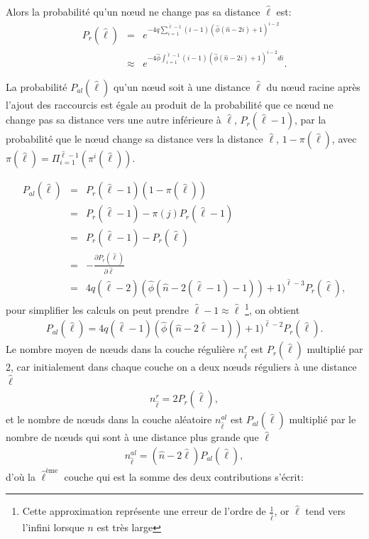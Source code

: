 Alors la probabilité qu'un nœud ne change pas sa distance $\hat{\ell}$ est: 
\begin{eqnarray}
\label{pr}
P_r(\hat{\ell})&=& e^{-4q\sum_{i=1}^{\hat{\ell}-1}(i-1)(\hat{\phi}(\hat{n}-2i)+1)^{i-2}}\\\nonumber
&\approx&e^{-4\hat{\phi}\int_{i=1}^{\hat{\ell}-1}(i-1)(\hat{\phi}(\hat{n}-2i)+1)^{i-2}di}.
\end{eqnarray}

La probabilité $P_{al}(\hat{\ell})$ qu'un nœud soit à une  distance $\hat{\ell}$ du nœud racine après l'ajout des raccourcis est égale au produit de la probabilité que ce nœud ne change pas sa distance vers une autre inférieure à  $\hat{\ell}$, $P_r(\hat{\ell}-1)$, par la probabilité que le nœud change sa distance vers la  distance $\hat{\ell}$, $1-\pi(\hat{\ell})$, avec $\pi(\hat{\ell})=\Pi^{\hat{\ell}-1}_{i=1}(\pi^i(\hat{\ell}))$.

\begin{eqnarray}\nonumber
P_{al}(\hat{\ell})&=&P_r(\hat{\ell}-1)(1-\pi(\hat{\ell}))\\\nonumber
&=&P_r(\hat{\ell}-1)-\pi(j)P_r(\hat{\ell}-1)\\\nonumber
&=&P_r(\hat{\ell}-1)-P_r(\hat{\ell})\\\nonumber
&=&-\frac{\partial P_r(\hat{\ell})}{\partial \hat{\ell}}\\
&=&4q(\hat{\ell}-2)(\hat{\phi}(\hat{n}-2(\hat{\ell}-1)-1))+1)^{\hat{\ell}-3}P_r(\hat{\ell}),
\end{eqnarray}
pour simplifier les calculs on peut prendre $\hat{\ell}-1\approx \hat{\ell}$ \footnote{Cette approximation représente une erreur de l'ordre de $\frac{1}{\hat{\ell}}$, or $\hat{\ell}$ tend vers l'infini lorsque $n$ est très large}, on obtient
\begin{eqnarray}
P_{al}(\hat{\ell})=4q(\hat{\ell}-1)(\hat{\phi}(\hat{n}-2\hat{\ell}-1))+1)^{\hat{\ell}-2}P_r(\hat{\ell}).
\label{pal}
\end{eqnarray}
Le nombre  moyen de nœuds dans la couche régulière $n_{\hat{\ell}}^r$ est $P_r(\hat{\ell})$ multiplié par $2$, car initialement dans chaque couche on a  deux nœuds réguliers à une distance $\hat{\ell}$
\begin{eqnarray}
n_{\hat{\ell}}^r=2P_r(\hat{\ell}),
\label{cr}
\end{eqnarray}
et le nombre de nœuds dans la couche aléatoire $n_{\hat{\ell}}^{al}$ est $P_{al}(\hat{\ell})$ multiplié par le nombre de nœuds qui sont à une distance plus grande que $\hat{\ell}$
\begin{eqnarray}
n_{\hat{\ell}}^{al}=(\hat{n}-2\hat{\ell})P_{al}(\hat{\ell}),
\label{cal}
\end{eqnarray}
d'où la $\hat{\ell}^{\text{ème}}$ couche qui est la somme des deux contributions s'écrit:

